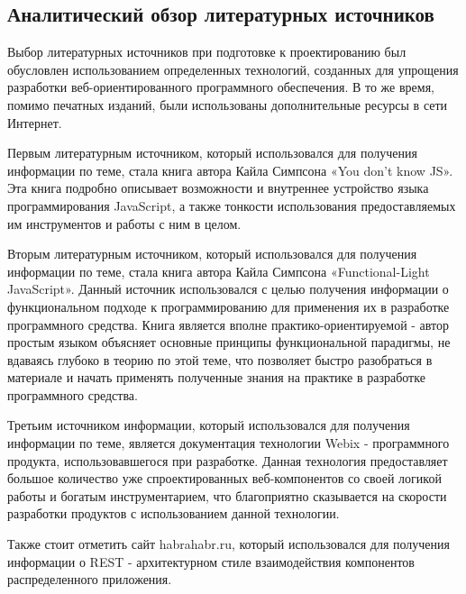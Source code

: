 \subsection{Аналитический обзор литературных источников}
\label{sec:analysis:literature}

Выбор литературных источников при подготовке к проектированию был обусловлен использованием определенных технологий, созданных для упрощения разработки веб-ориентированного программного обеспечения. В то же время, помимо печатных изданий, были использованы дополнительные ресурсы в сети Интернет.

Первым литературным источником, который использовался для получения информации по теме, стала книга автора Кайла Симпсона «You don’t know JS». Эта книга подробно описывает возможности и внутреннее устройство языка программирования JavaScript, а также тонкости использования предоставляемых им инструментов и работы с ним в целом. 

Вторым литературным источником, который использовался для получения информации по теме, стала книга автора Кайла Симпсона «Functional-Light JavaScript». Данный источник использовался с целью получения информации о функциональном подходе к программированию для применения их в разработке программного средства. Книга является вполне практико-ориентируемой - автор простым языком объясняет основные принципы функциональной парадигмы, не вдаваясь глубоко в теорию по этой теме, что позволяет быстро разобраться в материале и начать применять полученные знания на практике в разработке программного средства.

Третьим источником информации, который использовался для получения информации по теме, является документация технологии Webix - программного продукта, использовавшегося при разработке. Данная технология предоставляет большое количество уже спроектированных веб-компонентов со своей логикой работы и богатым инструментарием, что благоприятно сказывается на скорости разработки продуктов с использованием данной технологии.

Также стоит отметить сайт habrahabr.ru, который использовался для получения информации о REST - архитектурном стиле взаимодействия компонентов распределенного приложения.